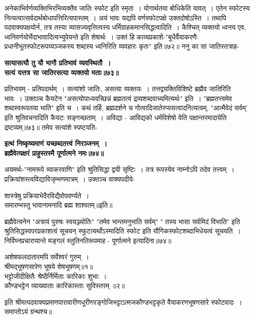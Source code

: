 {{{{ अनेकाभिर्वर्णव्यक्तिभिरभिव्यक्तैव जातिः स्फोट इति स्मृता~।
योगार्थतया बोधिकेति यावत्~।
एतेन स्फोटस्य नित्यत्वात्सर्वदार्थबोधापत्तिरित्यपास्तम्~।
अयं भावः यद्यपि वर्णस्फोटपक्षे उक्तदोषोऽस्ति~।
तथापि पदवाक्यपक्षयोर्न, तत्र तस्या व्यासज्यवृत्तित्वस्य धर्मिग्राहकमानसिद्धत्वादिति~।
कैश्चित् व्यक्तयो ध्वनय एव, ध्वनिवर्णयोर्भेदाभावादित्यभ्युपेयन्ते इति शेषार्थः~।
उक्तं हि काव्यप्रकाशे-"बुधैर्वैयाकरणैः प्रधानीभूतस्फोटरूपव्यञ्जकस्य शब्दस्य ध्वनिरिति व्यवहारः कृतः" इति॥७२॥
 ननु का सा जातिस्तत्राह-
 \begin{center}{\bfseries सत्यासत्यौ तु यौ भागौ प्रतिभावं व्यवस्थितौ~।\\
सत्यं यत्तत्र सा जातिरसत्या व्यक्तयो मताः॥७३॥}\end{center}
प्रतिभावम् - प्रतिपदार्थम्~।
सत्यांशो जातिः, असत्या व्यक्तयः~।
तत्तद्व्यक्तिविशिष्टे ब्रह्मैव जातिरिति भावः~।
उक्तञ्च कैयटेन "असत्योपाध्यवच्छिन्नं ब्रह्मतत्वं द्रव्यशब्दवाच्यमित्यर्थः" इति~।
"ब्रह्मतत्त्वमेव शब्दस्वरूपतया भाति" इति च~।
कथं तर्हि, ब्रह्मदर्शने च गोत्वादिजातेरप्यसत्वादनित्यत्वम्, "आत्मैवेदं सर्वम्' इति श्रुतिवचनादिति कैयटः सङ्गच्छताम्~।
अविद्या - आविद्यको धर्मविशेषो वेति पक्षान्तरमादायेति द्रष्टव्यम्॥७३॥
तमेव सत्यांशे स्पष्टयति-
\begin{center}{\bfseries इत्थं निष्कृष्यमाणं यच्छब्दतत्त्वं निरञ्जनम्~।\\
ब्रह्मैवेत्यक्षरं प्राहुस्तस्मै पूर्णात्मने नमः॥७४॥}\end{center}
 अयमर्थः-"नामरूपे व्याकरवाणि" इति श्रुतिसिद्धा द्वयी सृष्टिः~।
तत्र रूपस्येव नाम्नोऽपि तदेव तत्त्वम्~।
प्रक्रियांशस्त्वविद्याविजृम्भणमात्रम्~।
उक्तञ्च वाक्यपदीये-
\begin{center}
शास्त्रेषु प्रक्रियाभेदैरविद्यैवोपवर्ण्यते~।\\
समारम्भस्तु भावानामनादि ब्रह्म शाश्वतम्॥इति॥\end{center}
ब्रह्मैवेत्यनेन "अत्रायं पुरुषः स्वयञ्ज्योतिः" "तमेव भान्तमनुभाति सर्वम्" " तस्य भासा सर्वमिदं विभाति" इति श्रुतिसिद्धस्वपरप्रकाशत्वं सूचयन् स्फुटत्यर्थोऽस्मादिति स्फोट इति यौगिकस्फोटशब्दाभिधेयत्वं सूचयति~।
निर्विघ्नप्रचारायान्ते मङ्गलं स्तुतिनतिरूपमाह - पूर्णात्मने इत्यादिना॥७४॥
\begin{center} अशेषफलदातारमपि सर्वेश्वरं गुरुम्~।\\
श्रीमद्भूषणसारेण भूषये शेषभूषणम्॥१॥\\[10pt]
 भट्टोजीदीक्षितैः श्रेष्ठैर्निर्मिताः कारिकाः शुभाः~।\\
कौण्डभट्टेन व्याख्याताः कारिकास्ताः सुविस्तरम् ॥२॥\end{center}
इति श्रीमत्पदवाक्यप्रमाणपारावारीणधुरीणरङ्गोजिभट्टाऽत्मजकौण्डभट्टकृते वैयाकरणभूषणसारे स्फोटवादः~।
समाप्तोऽयं ग्रन्थश्च॥
}}}}
